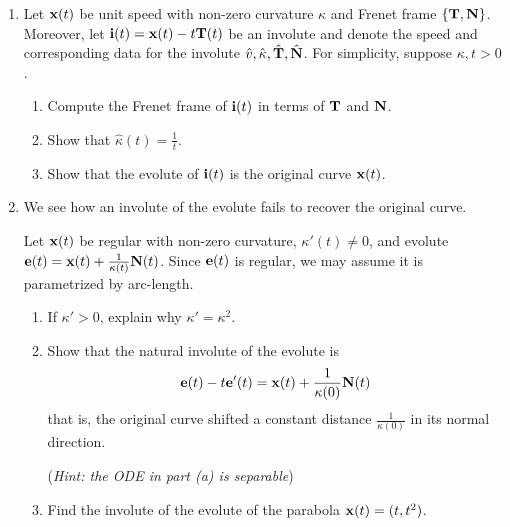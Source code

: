 \begin{exercises}
\begin{enumerate}
	
		\item Let ${\mathbf{x}}(t)$ be unit speed with non-zero curvature $\kappa$ and Frenet frame $\{{\mathbf{T}},{\mathbf{N}}\}$. Moreover, let ${\mathbf{i}}(t)={\mathbf{x}}(t)-t{\mathbf{T}}(t)$ be an involute and denote the speed and corresponding data for the involute $\hat v,\hat\kappa,\hat{{\mathbf{T}}},\hat{{\mathbf{N}}}$. For simplicity, suppose $\kappa,t>0$.
		\begin{enumerate}
		  \item Compute the Frenet frame of ${\mathbf{i}}(t)$ in terms of ${\mathbf{T}}$ and ${\mathbf{N}}$.
		  
		  \item Show that $\hat\kappa(t)=\frac 1t$.
		  
		  \item Show that the evolute of ${\mathbf{i}}(t)$ is the original curve ${\mathbf{x}}(t)$.
		\end{enumerate}
		
		
		\item We see how an involute of the evolute fails to recover the original curve.\par
		Let ${\mathbf{x}}(t)$ be regular with non-zero curvature, $\kappa'(t)\neq 0$, and evolute ${\mathbf{e}}(t)={\mathbf{x}}(t)+\frac 1{\kappa(t)}{\mathbf{N}}(t)$. Since ${\mathbf{e}}(t)$ is regular, we may assume it is parametrized by arc-length.
		\begin{enumerate}
		  \item If $\kappa'>0$, explain why $\kappa'=\kappa^2$.
		  \item Show that the natural involute of the evolute is
		  \[
				{\mathbf{e}}(t)-t{\mathbf{e}}'(t)={\mathbf{x}}(t)+\frac 1{\kappa(0)}{\mathbf{N}}(t)
			\]
		  that is, the original curve shifted a constant distance $\frac 1{\kappa(0)}$ in its normal direction.\par
		  (\emph{Hint: the ODE in part (a) is separable})
		  \item Find the involute of the evolute of the parabola ${\mathbf{x}}(t)=(t,t^2)$.
		\end{enumerate}	
%   

	\end{enumerate}
\end{exercises}





